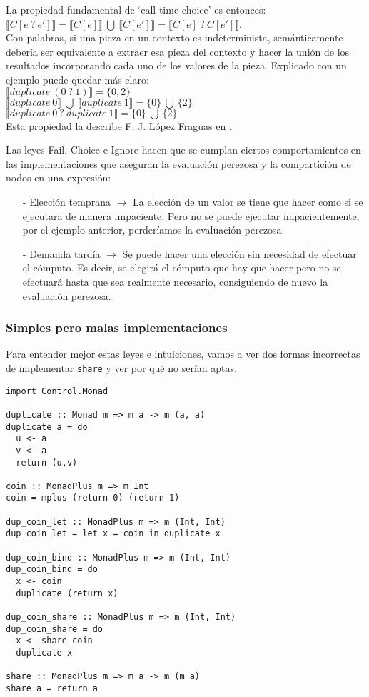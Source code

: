 \documentclass[class=article, crop=false]{standalone}
\begin{document}
La propiedad fundamental de `call-time choice' es entonces: \\
$\llbracket C[e \: ? \: e']\rrbracket
=\llbracket C[e]\rrbracket \:\bigcup\: \llbracket C[e']\rrbracket
=\llbracket C[e] \:?\: C[e']\rrbracket$. \\
Con palabras, si una pieza en un contexto es
indeterminista, semánticamente debería ser equivalente a extraer esa pieza del contexto y
hacer la unión de los resultados incorporando cada uno de los valores de la pieza. Explicado
con un ejemplo puede quedar más claro: \\
$\llbracket duplicate \: (0 \: ? \: 1)\rrbracket = \{0, 2\}$ \\
$\llbracket duplicate \:0\rrbracket\:\bigcup\:\llbracket duplicate \: 1\rrbracket
=\{0\} \:\bigcup\: \{2\}$ \\
$\llbracket duplicate \:0 \:?\: duplicate \:1\rrbracket = \{0\} \:\bigcup\: \{2\}$ \\
Esta propiedad la describe F. J. López Fraguas en \cite{lopez2007simple}.

Las leyes Fail, Choice e Ignore hacen que se cumplan ciertos comportamientos en las
implementaciones que aseguran la evaluación perezosa y la compartición de nodos en una
expresión:

\begin{itemize}
  \item[-] Elección temprana $\rightarrow$ La elección de un valor se tiene que hacer como si
  se ejecutara de manera impaciente. Pero no se puede ejecutar impacientemente, por el
  ejemplo anterior, perderíamos la evaluación perezosa.
  \item[-] Demanda tardía $\rightarrow$ Se puede hacer una elección sin necesidad de efectuar
  el cómputo. Es decir, se elegirá el cómputo que hay que hacer pero no se efectuará hasta
  que sea realmente necesario, consiguiendo de nuevo la evaluación perezosa.
\end{itemize}
\newpage

\subsubsection{Simples pero malas implementaciones}
Para entender mejor estas leyes e intuiciones, vamos a ver dos formas incorrectas de
implementar \verb`share` y ver por qué no serían aptas.

\begin{verbatim}  
import Control.Monad

duplicate :: Monad m => m a -> m (a, a)
duplicate a = do
  u <- a
  v <- a
  return (u,v)

coin :: MonadPlus m => m Int
coin = mplus (return 0) (return 1)

dup_coin_let :: MonadPlus m => m (Int, Int)
dup_coin_let = let x = coin in duplicate x

dup_coin_bind :: MonadPlus m => m (Int, Int)
dup_coin_bind = do
  x <- coin
  duplicate (return x)

dup_coin_share :: MonadPlus m => m (Int, Int)
dup_coin_share = do
  x <- share coin
  duplicate x

share :: MonadPlus m => m a -> m (m a)
share a = return a
\end{verbatim}
\end{document}
